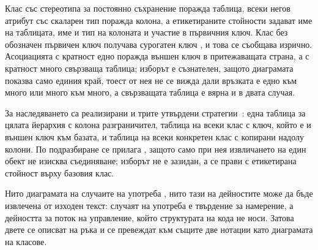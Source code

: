 Клас със стереотипа за постоянно съхранение поражда таблица, всеки негов атрибут със скаларен тип
поражда колона, а етикетираните стойности задават име на таблицата, име и тип на колоната и участие в
първичния ключ. Клас без обозначен първичен ключ получава сурогатен ключ , и това се съобщава
изрично. Асоциацията с кратност едно поражда външен ключ в притежаващата страна, а с кратност много
свързваща таблица; изборът е съзнателен, защото диаграмата показва само единия край, тоест от нея не
се вижда дали връзката е едно към много или много към много, а свързващата таблица е вярна и в двата
случая.

За наследяването са реализирани и трите утвърдени стратегии~\cite{ambler2003agiledb}: една таблица за
цялата йерархия с колона разграничител, таблица на всеки клас с ключ, който е и външен ключ към базата,
и таблица на всеки конкретен клас с копирани надолу колони. По подразбиране се прилага , защото само при нея извличането на един обект не изисква съединяване; изборът
не е зазидан, а се прави с етикетирана стойност върху базовия клас.

Нито диаграмата на случаите на употреба , нито тази на дейностите
 може да бъде извлечена от изходен текст: случаят на употреба е твърдение за
намерение, а дейността за поток на управление, който структурата на кода не носи. Затова двете се
описват на ръка и се превеждат към същите две нотации като диаграмата на класове.

